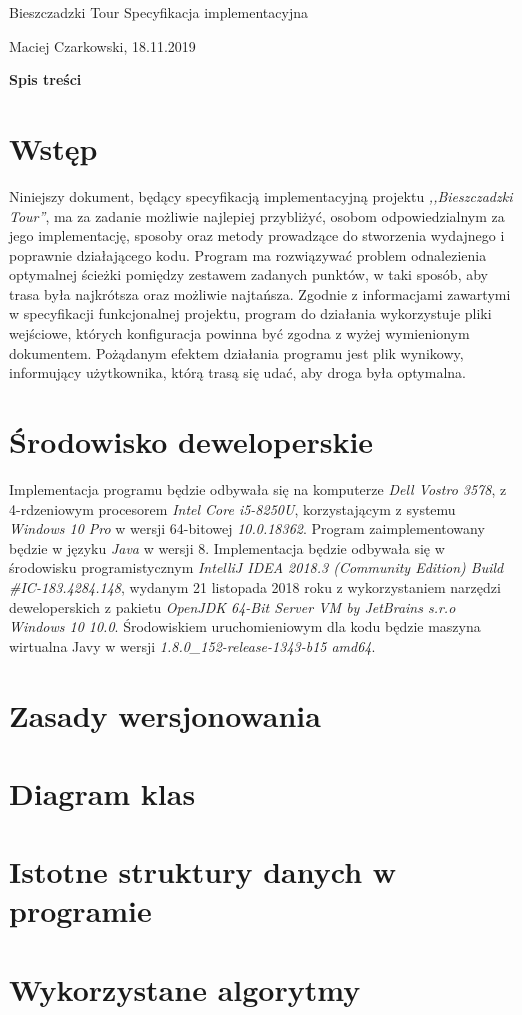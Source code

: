 \documentclass[12pt,a4paper]{article}
\begin{document}
\begin{titlepage}
\vspace*{\fill}
\begin{center}
{\fontsize{50}{0.1}\selectfont Bieszczadzki Tour}
\huge Specyfikacja implementacyjna
\end{center}
\vspace*{\fill}
\begin{center}
Maciej Czarkowski, 18.11.2019
\end{center}
\end{titlepage}
\clearpage
\hspace{1cm}
\begin{center}
\LARGE\textbf{Spis treści}
\end{center}
\tableofcontents
\clearpage
\section{Wstęp}
Niniejszy dokument, będący specyfikacją implementacyjną projektu \textsl{,,Bieszczadzki Tour''}, ma za zadanie możliwie najlepiej przybliżyć, osobom odpowiedzialnym za jego implementację, sposoby oraz metody prowadzące do stworzenia wydajnego i poprawnie działającego kodu. Program ma rozwiązywać problem odnalezienia optymalnej ścieżki pomiędzy zestawem zadanych punktów, w taki sposób, aby trasa była najkrótsza oraz możliwie najtańsza. Zgodnie z informacjami zawartymi w specyfikacji funkcjonalnej projektu, program do działania wykorzystuje pliki wejściowe, których konfiguracja powinna być zgodna z wyżej wymienionym dokumentem. Pożądanym efektem działania programu jest plik wynikowy, informujący użytkownika, którą trasą się udać, aby droga była optymalna.\\
\section{Środowisko deweloperskie}
Implementacja programu będzie odbywała się na komputerze \textsl{Dell Vostro 3578}, z 4-rdzeniowym procesorem \textsl{Intel Core i5-8250U}, korzystającym z systemu \textsl{Windows 10 Pro} w wersji 64-bitowej \textsl{10.0.18362}. Program zaimplementowany będzie w języku \textsl{Java} w wersji 8. Implementacja będzie odbywała się w środowisku programistycznym \textsl{IntelliJ IDEA 2018.3 (Community Edition)
Build \#IC-183.4284.148}, wydanym 21 listopada 2018 roku z wykorzystaniem narzędzi deweloperskich z pakietu \textsl{OpenJDK 64-Bit Server VM by JetBrains s.r.o Windows 10 10.0}. Środowiskiem uruchomieniowym dla kodu będzie maszyna wirtualna Javy w wersji \textsl{1.8.0\_152-release-1343-b15 amd64}.
\section{Zasady wersjonowania}
\section{Diagram klas}
\section{Istotne struktury danych w programie}
\section{Wykorzystane algorytmy}
\end{document}
